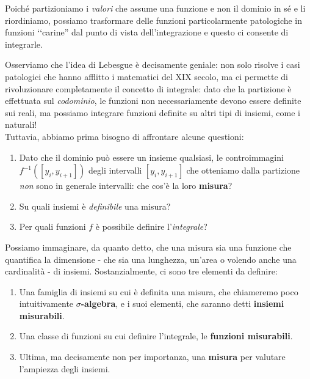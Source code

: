 \begin{intuit}
Poiché partizioniamo i \textit{valori} che assume una funzione e non il dominio in sé e li riordiniamo, possiamo trasformare delle funzioni particolarmente patologiche in funzioni ‘‘carine'' dal punto di vista dell'integrazione e questo ci consente di integrarle.
\end{intuit}
Osserviamo che l'idea di Lebesgue è decisamente geniale: non solo risolve i casi patologici che hanno afflitto i matematici del XIX secolo, ma ci permette di rivoluzionare completamente il concetto di integrale: dato che la partizione è effettuata sul \textit{codominio}, le funzioni non necessariamente devono essere definite sui reali, ma possiamo integrare funzioni definite su altri tipi di insiemi, come i naturali!\\
Tuttavia, abbiamo prima bisogno di affrontare alcune questioni:
\begin{enumerate}
	\item Dato che il dominio può essere un insieme qualsiasi, le controimmagini $f^{-1}\left(\left[y_i,y_{i+1}\right]\right)$ degli intervalli $\left[y_i,y_{i+1}\right]$ che otteniamo dalla partizione \textit{non} sono in generale intervalli: che cos'è la loro \textbf{misura}?
	\item Su quali insiemi è \textit{definibile} una misura?
	\item Per quali funzioni $f$ è possibile definire l'\textit{integrale}?
\end{enumerate}
Possiamo immaginare, da quanto detto, che una misura sia una funzione che quantifica la dimensione - che sia una lunghezza, un'area o volendo anche una cardinalità - di insiemi. Sostanzialmente, ci sono tre elementi da definire:
\begin{enumerate}[label=(\Roman*)]
	\item Una famiglia di insiemi su cui è definita una misura, che chiameremo poco intuitivamente $\sigma$\textbf{-algebra}, e i suoi elementi, che saranno detti \textbf{insiemi misurabili}.
	\item Una classe di funzioni su cui definire l’integrale, le \textbf{funzioni misurabili}.
	\item Ultima, ma decisamente non per importanza, una \textbf{misura} per valutare l’ampiezza degli insiemi.
\end{enumerate}
